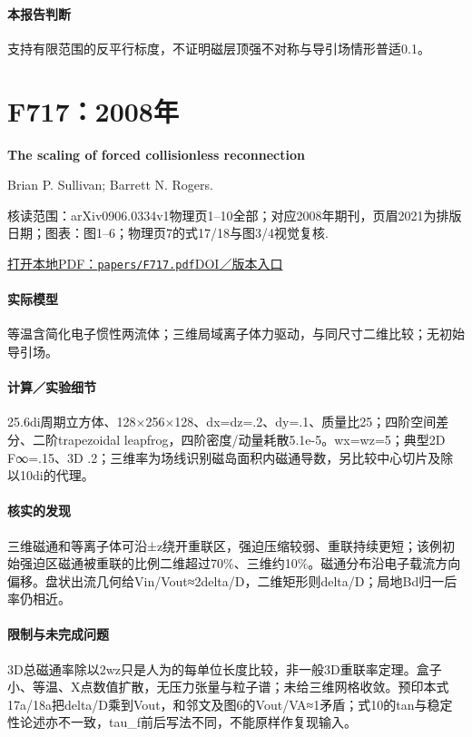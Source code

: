 \paragraph{本报告判断}支持有限范围的反平行标度，不证明磁层顶强不对称与导引场情形普适0.1。

\section{F717：2008年}\label{paper:F717}

\textbf{The scaling of forced collisionless reconnection}\citep{F717}\

Brian P. Sullivan;  Barrett N. Rogers.

\textsf{核读范围：}arXiv0906.0334v1物理页1–10全部；对应2008年期刊，页眉2021为排版日期；\textsf{图表：}图1–6；物理页7的式17/18与图3/4视觉复核.

\href{run:papers/F717.pdf}{打开本地PDF：\texttt{papers/F717.pdf}}\quad\href{https://doi.org/10.1063/1.2992136}{DOI／版本入口}

\paragraph{实际模型}等温含简化电子惯性两流体；三维局域离子体力驱动，与同尺寸二维比较；无初始导引场。

\paragraph{计算／实验细节}25.6di周期立方体、128×256×128、dx=dz=.2、dy=.1、质量比25；四阶空间差分、二阶trapezoidal leapfrog，四阶密度/动量耗散5.1e-5。wx=wz=5；典型2D F∞=.15、3D .2；三维率为场线识别磁岛面积内磁通导数，另比较中心切片及除以10di的代理。

\paragraph{核实的发现}三维磁通和等离子体可沿±z绕开重联区，强迫压缩较弱、重联持续更短；该例初始强迫区磁通被重联的比例二维超过70\%、三维约10\%。磁通分布沿电子载流方向偏移。盘状出流几何给Vin/Vout≈2delta/D，二维矩形则delta/D；局地Bd归一后率仍相近。

\paragraph{限制与未完成问题}3D总磁通率除以2wz只是人为的每单位长度比较，非一般3D重联率定理。盒子小、等温、X点数值扩散，无压力张量与粒子谱；未给三维网格收敛。预印本式17a/18a把delta/D乘到Vout，和邻文及图6的Vout/VA≈1矛盾；式10的tan与稳定性论述亦不一致，tau\_f前后写法不同，不能原样作复现输入。

